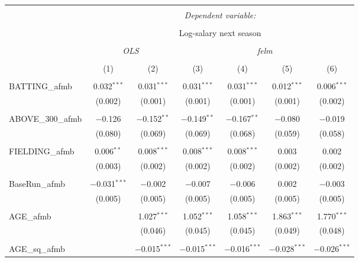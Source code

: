 
\begin{table}[!htbp] \centering
  \caption{}
  \label{}
  \scriptsize
\begin{tabular}{@{\extracolsep{5pt}}lcccccc}
\\[-1.8ex]\hline
\hline \\[-1.8ex]
 & \multicolumn{6}{c}{\textit{Dependent variable:}} \\
\cline{2-7}
\\[-1.8ex] & \multicolumn{6}{c}{Log-salary next season} \\
\\[-1.8ex] & \multicolumn{2}{c}{\textit{OLS}} & \multicolumn{4}{c}{\textit{felm}} \\
\\[-1.8ex] & (1) & (2) & (3) & (4) & (5) & (6)\\
\hline \\[-1.8ex]
 BATTING\_afmb & 0.032$^{***}$ & 0.031$^{***}$ & 0.031$^{***}$ & 0.031$^{***}$ & 0.012$^{***}$ & 0.006$^{***}$ \\
  & (0.002) & (0.001) & (0.001) & (0.001) & (0.001) & (0.002) \\
  & & & & & & \\
 ABOVE\_300\_afmb & $-$0.126 & $-$0.152$^{**}$ & $-$0.149$^{**}$ & $-$0.167$^{**}$ & $-$0.080 & $-$0.019 \\
  & (0.080) & (0.069) & (0.069) & (0.068) & (0.059) & (0.058) \\
  & & & & & & \\
 FIELDING\_afmb & 0.006$^{**}$ & 0.008$^{***}$ & 0.008$^{***}$ & 0.008$^{***}$ & 0.003 & 0.002 \\
  & (0.003) & (0.002) & (0.002) & (0.002) & (0.002) & (0.002) \\
  & & & & & & \\
 BaseRun\_afmb & $-$0.031$^{***}$ & $-$0.002 & $-$0.007 & $-$0.006 & 0.002 & $-$0.003 \\
  & (0.005) & (0.005) & (0.005) & (0.005) & (0.005) & (0.005) \\
  & & & & & & \\
 AGE\_afmb &  & 1.027$^{***}$ & 1.052$^{***}$ & 1.058$^{***}$ & 1.863$^{***}$ & 1.770$^{***}$ \\
  &  & (0.046) & (0.045) & (0.045) & (0.049) & (0.048) \\
  & & & & & & \\
 AGE\_sq\_afmb &  & $-$0.015$^{***}$ & $-$0.015$^{***}$ & $-$0.016$^{***}$ & $-$0.028$^{***}$ & $-$0.026$^{***}$ \\

\end{tabular}
\end{table}
